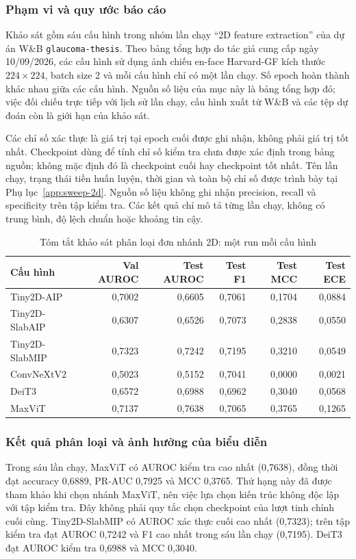 \documentclass[14pt,a4paper,oneside]{extreport}
\begin{document}
\subsubsection{Phạm vi và quy ước báo cáo}
Khảo sát gồm sáu cấu hình trong nhóm lần chạy ``2D feature extraction''
của dự án W\&B \texttt{glaucoma-thesis}. Theo bảng tổng hợp do tác giả
cung cấp ngày 10/09/2026, các cấu hình sử dụng ảnh chiếu en-face
Harvard-GF kích thước $224\times224$, batch size 2 và mỗi cấu hình
chỉ có một lần chạy. Số epoch hoàn thành khác nhau giữa các cấu hình.
Nguồn số liệu của mục này là bảng tổng hợp đó; việc đối chiếu trực tiếp
với lịch sử lần chạy, cấu hình xuất từ W\&B và các tệp dự đoán còn là giới hạn của khảo sát.

Các chỉ số xác thực là giá trị tại epoch cuối được ghi nhận, không
phải giá trị tốt nhất. Checkpoint dùng để tính chỉ số kiểm tra chưa
được xác định trong bảng nguồn; không mặc định đó là checkpoint cuối
hay checkpoint tốt nhất. Tên lần chạy, trạng thái tiền huấn luyện, thời gian
và toàn bộ chỉ số được trình bày tại Phụ lục~\ref{app:sweep-2d}.
Nguồn số liệu không ghi nhận precision, recall và specificity trên tập kiểm tra.
Các kết quả chỉ mô tả từng lần chạy, không có trung bình, độ lệch chuẩn hoặc khoảng tin cậy.

\begin{table}[htbp]
  \centering
  \caption{Tóm tắt khảo sát phân loại đơn nhánh 2D: một run mỗi cấu hình}
  \label{tab:sweep-2d-summary}
  \setlength{\tabcolsep}{4pt}
  \begin{tabular}{@{}lrrrrr@{}}
    \toprule
    \textbf{Cấu hình} & \textbf{Val AUROC} & \textbf{Test AUROC} & \textbf{Test F1} & \textbf{Test MCC} & \textbf{Test ECE}\\
    \midrule
    Tiny2D-AIP     & 0,7002 & 0,6605 & 0,7061 & 0,1704 & 0,0884\\
    Tiny2D-SlabAIP & 0,6307 & 0,6526 & 0,7073 & 0,2838 & 0,0550\\
    Tiny2D-SlabMIP & 0,7323 & 0,7242 & 0,7195 & 0,3210 & 0,0549\\
    ConvNeXtV2    & 0,5023 & 0,5152 & 0,7041 & 0,0000 & 0,0021\\
    DeiT3         & 0,6572 & 0,6988 & 0,6962 & 0,3040 & 0,0568\\
    MaxViT        & 0,7137 & 0,7638 & 0,7065 & 0,3765 & 0,1265\\
    \bottomrule
  \end{tabular}
\end{table}

\subsubsection{Kết quả phân loại và ảnh hưởng của biểu diễn}
Trong sáu lần chạy, MaxViT có AUROC kiểm tra cao nhất (0,7638), đồng thời
đạt accuracy 0,6889, PR-AUC 0,7925 và MCC 0,3765. Thứ hạng này đã
được tham khảo khi chọn nhánh MaxViT, nên việc lựa chọn kiến trúc
không độc lập với tập kiểm tra. Đây không phải quy tắc chọn
checkpoint của lượt tinh chỉnh cuối cùng.
Tiny2D-SlabMIP có AUROC xác thực cuối cao nhất (0,7323); trên tập
kiểm tra đạt AUROC 0,7242 và F1 cao nhất trong sáu lần chạy (0,7195).
DeiT3 đạt AUROC kiểm tra 0,6988 và MCC 0,3040.
\end{document}
